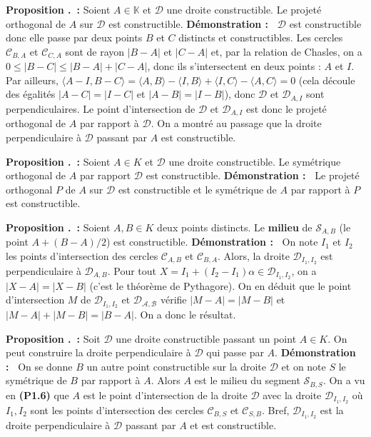 \documentclass[5pt,a4paper]{article}
\newcounter{prop}[section]
\renewcommand{\theprop}{\thesection.\arabic{prop}}
\newcommand{\prop}[1]{\stepcounter{prop}\noindent\textbf{Proposition \theprop ~:} #1 \newline}
\newcommand{\demo}[1]{\textbf{Démonstration :~} #1 \newline}
\begin{document}
\begin{onehalfspacing}
\prop{Soient $A \in \mathbb{K}$ et $\mathcal{D}$ une droite constructible. Le projeté orthogonal de $A$ sur $\mathcal{D}$ est constructible.}
\demo{$\mathcal{D}$ est constructible donc elle passe par deux points $B$ et $C$ distincts et constructibles. Les cercles $\mathcal{C}_{B, A}$ et $\mathcal{C}_{C, A}$ sont de rayon $|B-A|$ et $|C-A|$ et, par la relation de Chasles, on a $0 \leq |B-C| \leq |B-A| + |C-A|$, donc ils s'intersectent en deux points : $A$ et $I$. Par ailleurs, $\langle A - I, B - C \rangle = \langle A, B \rangle - \langle I, B \rangle + \langle I, C \rangle - \langle A, C \rangle = 0$ (cela découle des égalités $|A-C| = |I-C|$ et $|A-B| = |I-B|$), donc $\mathcal{D}$ et $\mathcal{D}_{A, I}$ sont perpendiculaires. Le point d'intersection de $\mathcal{D}$ et $\mathcal{D}_{A, I}$ est donc le projeté orthogonal de $A$ par rapport à $\mathcal{D}$. On a montré au passage que la droite perpendiculaire à $\mathcal{D}$ passant par $A$ est constructible.}

\prop{Soient $A \in K$ et $\mathcal{D}$ une droite constructible. Le symétrique orthogonal de $A$ par rapport $\mathcal{D}$ est constructible.}
\demo{Le projeté orthogonal $P$ de $A$ sur $\mathcal{D}$ est constructible et le symétrique de $A$ par rapport à $P$ est constructible.}


\prop{Soient $A,B \in K$ deux points distincts. Le \textbf{milieu} de $\mathcal{S}_{A, B}$ (le point $A + (B-A)/2$) est constructible.}
\demo{On note $I_1$ et $I_2$ les points d'intersection des cercles $\mathcal{C}_{A, B}$ et $\mathcal{C}_{B, A}$. Alors, la droite $\mathcal{D}_{I_1, I_2}$ est perpendiculaire à $\mathcal{D}_{A, B}$. Pour tout $X = I_1 + (I_2 - I_1)\alpha \in \mathcal{D}_{I_1, I_2}$, on a $|X - A| = |X - B|$ (c'est le théorème de Pythagore). On en déduit que le point d'intersection $M$ de $\mathcal{D}_{I_1, I_2}$ et $\mathcal{D_{A, B}}$ vérifie $|M-A| = |M-B|$ et $|M-A| + |M-B| = |B-A|$. On a donc le résultat.}

\prop{Soit $\mathcal{D}$ une droite constructible passant un point $A \in K$. On peut construire la droite perpendiculaire à $\mathcal{D}$ qui passe par $A$.}
\demo{On se donne $B$ un autre point constructible sur la droite $\mathcal{D}$ et on note $S$ le symétrique de $B$ par rapport à $A$. Alors $A$ est le milieu du segment $\mathcal{S}_{B, S}$. On a vu en \textbf{(P1.6)} que $A$ est le point d'intersection de la droite $\mathcal{D}$ avec la droite $\mathcal{D}_{I_1, I_2}$ où $I_1, I_2$ sont les points d'intersection des cercles $\mathcal{C}_{B, S}$ et $\mathcal{C}_{S, B}$. Bref, $\mathcal{D}_{I_1, I_2}$ est la droite perpendiculaire à $\mathcal{D}$ passant par $A$ et est constructible.}


\end{onehalfspacing}
\end{document}
